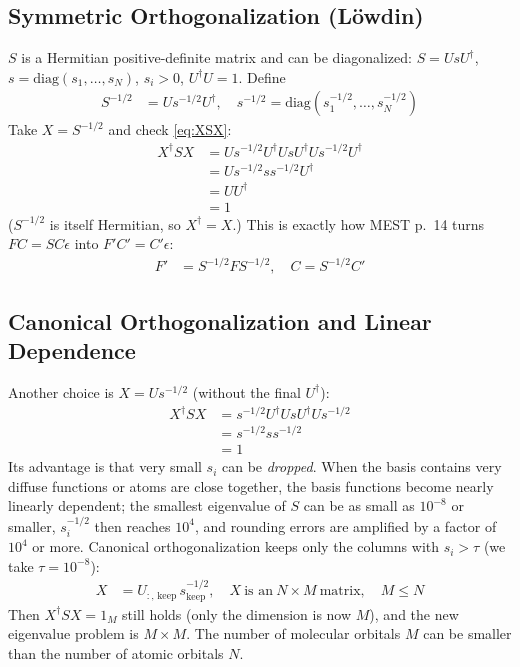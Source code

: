 \subsection{Symmetric Orthogonalization (Löwdin)}

$S$ is a Hermitian positive-definite matrix and can be diagonalized: $S = U s U^\dagger$, $s = \mathrm{diag}(s_1, \ldots, s_N)$, $s_i > 0$, $U^\dagger U = 1$. Define
\begin{align*}
S^{-1/2} &= U s^{-1/2} U^\dagger, \quad s^{-1/2} = \text{diag}(s_1^{-1/2}, \ldots, s_N^{-1/2})
\end{align*}
Take $X = S^{-1/2}$ and check \eqref{eq:XSX}:
\begin{align*}
X^\dagger S X &= U s^{-1/2} U^\dagger U s U^\dagger U s^{-1/2} U^\dagger \\
&= U s^{-1/2} s s^{-1/2} U^\dagger \\
&= U U^\dagger \\
&= 1
\end{align*}
($S^{-1/2}$ is itself Hermitian, so $X^\dagger = X$.) This is exactly how MEST p.~14 turns $F C = S C \epsilon$ into $F' C' = C' \epsilon$:
\begin{align*}
F' &= S^{-1/2} F S^{-1/2}, \quad C = S^{-1/2} C'
\end{align*}

\subsection{Canonical Orthogonalization and Linear Dependence}

Another choice is $X = U s^{-1/2}$ (without the final $U^\dagger$):
\begin{align*}
X^\dagger S X &= s^{-1/2} U^\dagger U s U^\dagger U s^{-1/2} \\
&= s^{-1/2} s s^{-1/2} \\
&= 1
\end{align*}
Its advantage is that very small $s_i$ can be \emph{dropped}. When the basis contains very diffuse functions or atoms are close together, the basis functions become nearly linearly dependent; the smallest eigenvalue of $S$ can be as small as $10^{-8}$ or smaller, $s_i^{-1/2}$ then reaches $10^4$, and rounding errors are amplified by a factor of $10^4$ or more. Canonical orthogonalization keeps only the columns with $s_i > \tau$ (we take $\tau = 10^{-8}$):
\begin{align*}
X &= U_{:,\,\text{keep}}\, s_{\text{keep}}^{-1/2}, \quad X \ \text{is an}\ N \times M \ \text{matrix}, \quad M \le N
\end{align*}
Then $X^\dagger S X = 1_M$ still holds (only the dimension is now $M$), and the new eigenvalue problem is $M \times M$. The number of molecular orbitals $M$ can be smaller than the number of atomic orbitals $N$.

